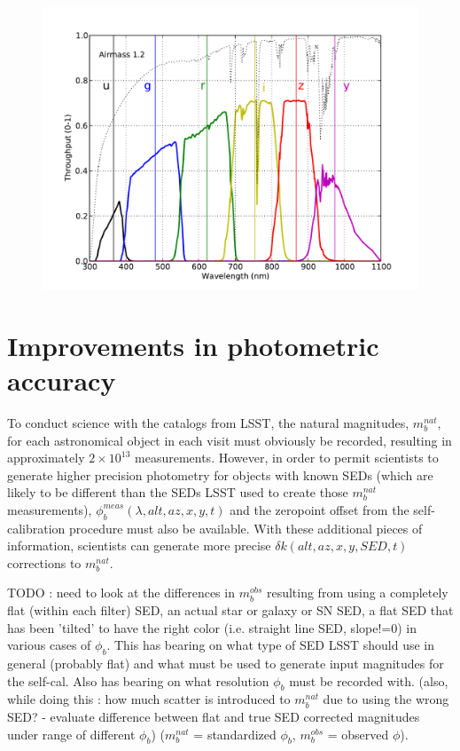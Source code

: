 \documentclass[12pt,preprint]{aastex}
\begin{document}
\begin{figure}[ht]
\includegraphics[width=5in]{filters}
\end{figure}


\section{Improvements in photometric accuracy}

To conduct science with the catalogs from LSST, the natural magnitudes, $m_b^{nat}$, for each astronomical object in
each visit must obviously be recorded, resulting in approximately
$2\times10^{13}$ measurements. However, in order to permit scientists
to generate higher precision photometry for objects with known SEDs
(which are likely to be different than the SEDs LSST used to create
those $m_b^{nat}$ measurements),
$\phi_b^{meas}(\lambda,alt,az,x,y,t)$ and the zeropoint offset from
the self-calibration procedure must also be available. With these
additional pieces of information, scientists can generate more precise
$\delta k(alt,az,x,y,SED,t)$ corrections to $m_b^{nat}$.

TODO : need to look at the differences in $m_b^{obs}$ resulting from
using a completely flat (within each filter) SED, an actual star or
galaxy or SN SED, a flat SED that has been 'tilted' to have the right
color (i.e. straight line SED, slope!=0) in various cases of
$\phi_b$. This has bearing on what type of SED LSST should use in
general (probably flat) and what must be used to generate input
magnitudes for the self-cal. Also has bearing on what resolution
$\phi_b$ must be recorded with.   (also, while doing this : how much
scatter is introduced to $m_b^{nat}$ due to using the wrong SED? -
evaluate difference between flat and true SED corrected magnitudes under range of different
$\phi_b$)  ($m_b^{nat}$ = standardized $\phi_b$, $m_b^{obs}$ =
observed $\phi$). 
\end{document}
